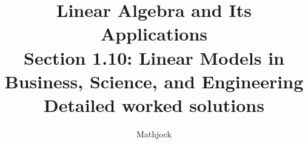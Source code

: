 
\title{\textbf{Linear Algebra and Its Applications}\\[0.3em]Section 1.10: Linear Models in Business, Science, and Engineering\\[0.3em]\large Detailed worked solutions}
\author{Mathjock}
\date{}

\maketitle
\bookinfo
\tableofcontents
\clearpage
\renewcommand{\thesection}{1.\arabic{section}}
\renewcommand{\theHsection}{1.\arabic{section}}
\setcounter{section}{9}


